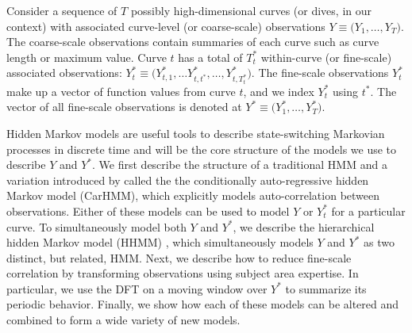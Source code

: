 
Consider a sequence of $T$ possibly high-dimensional curves (or dives, in our context) with associated curve-level (or coarse-scale) observations $Y \equiv \Big(Y_1, \ldots, Y_T\Big)$. The coarse-scale observations contain summaries of each curve such as curve length or maximum value. Curve $t$ has a total of $T^*_t$ within-curve (or fine-scale) associated observations: $Y^*_t \equiv \Big(Y^*_{t,1}, \ldots Y^*_{t,t^*}, \ldots, Y^*_{t,T^*_t}\Big)$. The fine-scale observations $Y^*_t$ make up a vector of function values from curve $t$, and we index $Y^*_t$ using $t^*$. The vector of all fine-scale observations is denoted at $Y^* \equiv \Big(Y^*_1,\ldots,Y^*_T\Big)$.

Hidden Markov models are useful tools to describe state-switching Markovian processes in discrete time and will be the core structure of the models we use to describe $Y$ and $Y^*$. %
We first describe the structure of a traditional HMM and a variation introduced by \cite{Lawler:2019} called the the conditionally auto-regressive hidden Markov model (CarHMM), which explicitly models auto-correlation between observations. Either of these models can be used to model $Y$ or $Y^*_t$ for a particular curve. To simultaneously model both $Y$ and $Y^*$, we describe the hierarchical hidden Markov model (HHMM) \citep{Barajas:2017,Adam:2019}, which simultaneously models $Y$ and $Y^*$ as two distinct, but related, HMM. Next, we describe how to reduce fine-scale correlation by transforming observations using subject area expertise. In particular, we use the DFT on a moving window over $Y^*$ to summarize its periodic behavior. Finally, we show how each of these models can be altered and combined to form a wide variety of new models.

